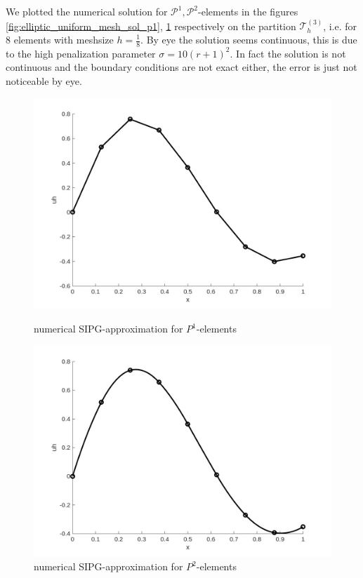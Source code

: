 We plotted the numerical solution for $\mathcal{P}^1, \mathcal{P}^2$-elements in the figures 
\ref{fig:elliptic_uniform_mesh_sol_p1}, \ref{fig:elliptic_uniform_mesh_sol_p2} respectively on the partition $\mathcal{T}_h^{(3)}$, i.e. for 
8 elements with meshsize $h = \frac{1}{8}$. By eye the solution seems continuous, this is due to the high penalization parameter 
$\sigma = 10(r+1)^2$. In fact the solution is not continuous and the boundary conditions are not exact either, the error is just not noticeable
by eye. 

\begin{figure}[h!]
    \centering
    
    \begin{minipage}[t]{0.48\textwidth}
        \centering
        \includegraphics[width=\linewidth]{figures/dg_elliptic_num_sol_p1.jpg}
        \caption{numerical SIPG-approximation for $P^1$-elements}
        \label{fig:elliptic_uniform_mesh_sol_p1}
    \end{minipage}
    \hfill
    \begin{minipage}[t]{0.48\textwidth}
        \centering
        \includegraphics[width=\linewidth]{figures/dg_elliptic_num_sol_p2.jpg}
        \caption{numerical SIPG-approximation for $P^2$-elements}
        \label{fig:elliptic_uniform_mesh_sol_p2}
    \end{minipage}
\end{figure}

